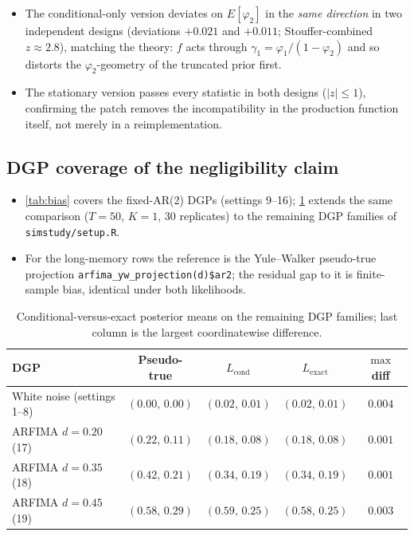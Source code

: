 \documentclass[11pt]{article}
\newcommand{\Lexact}{L_{\mathrm{exact}}}
\newcommand{\Lcond}{L_{\mathrm{cond}}}
\theoremstyle{plain}
\theoremstyle{definition}
\theoremstyle{remark}
\begin{document}
\begin{itemize}
  \item The conditional-only version deviates on $E[\varphi_2]$ in the
        \emph{same direction} in two independent designs (deviations
        $+0.021$ and $+0.011$; Stouffer-combined $z \approx 2.8$), matching
        the theory: $f$ acts through
        $\gamma_1 = \varphi_1 / (1 - \varphi_2)$ and so distorts the
        $\varphi_2$-geometry of the truncated prior first.
  \item The stationary version passes every statistic in both designs
        ($|z| \leq 1$), confirming the patch removes the incompatibility in
        the production function itself, not merely in a reimplementation.
\end{itemize}

\subsection{DGP coverage of the negligibility claim}\label{sec:coverage}

\begin{itemize}
  \item \cref{tab:bias} covers the fixed-AR(2) DGPs (settings 9--16);
        \cref{tab:coverage} extends the same comparison ($T = 50$, $K = 1$,
        $30$ replicates) to the remaining DGP families of
        \texttt{simstudy/setup.R}.
  \item For the long-memory rows the reference is the Yule--Walker
        pseudo-true projection \texttt{arfima\_yw\_projection(d)\$ar2}; the
        residual gap to it is finite-sample bias, identical under both
        likelihoods.
\end{itemize}

\begin{table}[ht]
\centering
\caption{Conditional-versus-exact posterior means on the remaining DGP
         families; last column is the largest coordinatewise difference.}
\label{tab:coverage}
\begin{tabular}{lcccc}
\toprule
DGP & Pseudo-true & $\Lcond$ & $\Lexact$ & $\max$ diff \\
\midrule
White noise (settings 1--8) & $(0.00,\, 0.00)$ & $(0.02,\, 0.01)$ & $(0.02,\, 0.01)$ & $0.004$ \\
ARFIMA $d = 0.20$ (17)      & $(0.22,\, 0.11)$ & $(0.18,\, 0.08)$ & $(0.18,\, 0.08)$ & $0.001$ \\
ARFIMA $d = 0.35$ (18)      & $(0.42,\, 0.21)$ & $(0.34,\, 0.19)$ & $(0.34,\, 0.19)$ & $0.001$ \\
ARFIMA $d = 0.45$ (19)      & $(0.58,\, 0.29)$ & $(0.59,\, 0.25)$ & $(0.58,\, 0.25)$ & $0.003$ \\
\bottomrule
\end{tabular}
\end{table}
\end{document}
